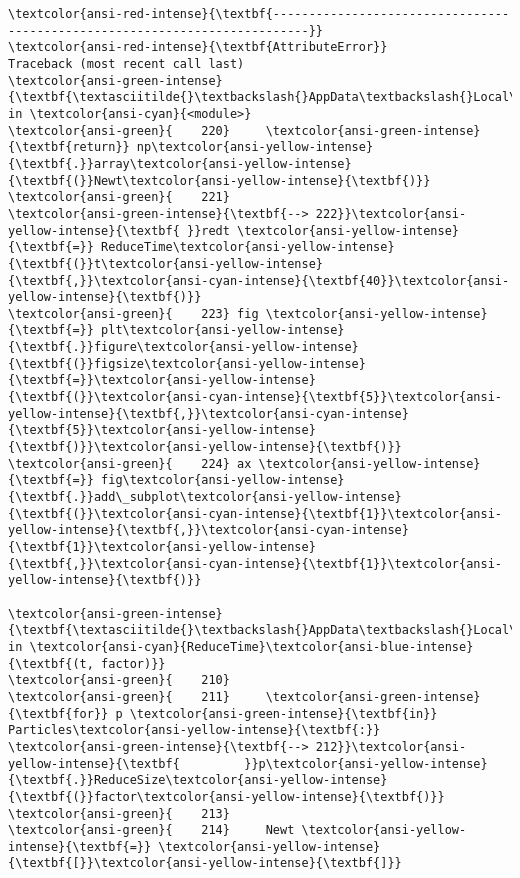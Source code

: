 \documentclass[11pt]{article}
\begin{document}
    \begin{Verbatim}[commandchars=\\\{\}, frame=single, framerule=2mm, rulecolor=\color{outerrorbackground}]
\textcolor{ansi-red-intense}{\textbf{---------------------------------------------------------------------------}}
\textcolor{ansi-red-intense}{\textbf{AttributeError}}                            Traceback (most recent call last)
\textcolor{ansi-green-intense}{\textbf{\textasciitilde{}\textbackslash{}AppData\textbackslash{}Local\textbackslash{}Temp/ipykernel\_12240/2143302627.py}} in \textcolor{ansi-cyan}{<module>}
\textcolor{ansi-green}{    220}     \textcolor{ansi-green-intense}{\textbf{return}} np\textcolor{ansi-yellow-intense}{\textbf{.}}array\textcolor{ansi-yellow-intense}{\textbf{(}}Newt\textcolor{ansi-yellow-intense}{\textbf{)}}
\textcolor{ansi-green}{    221} 
\textcolor{ansi-green-intense}{\textbf{--> 222}}\textcolor{ansi-yellow-intense}{\textbf{ }}redt \textcolor{ansi-yellow-intense}{\textbf{=}} ReduceTime\textcolor{ansi-yellow-intense}{\textbf{(}}t\textcolor{ansi-yellow-intense}{\textbf{,}}\textcolor{ansi-cyan-intense}{\textbf{40}}\textcolor{ansi-yellow-intense}{\textbf{)}}
\textcolor{ansi-green}{    223} fig \textcolor{ansi-yellow-intense}{\textbf{=}} plt\textcolor{ansi-yellow-intense}{\textbf{.}}figure\textcolor{ansi-yellow-intense}{\textbf{(}}figsize\textcolor{ansi-yellow-intense}{\textbf{=}}\textcolor{ansi-yellow-intense}{\textbf{(}}\textcolor{ansi-cyan-intense}{\textbf{5}}\textcolor{ansi-yellow-intense}{\textbf{,}}\textcolor{ansi-cyan-intense}{\textbf{5}}\textcolor{ansi-yellow-intense}{\textbf{)}}\textcolor{ansi-yellow-intense}{\textbf{)}}
\textcolor{ansi-green}{    224} ax \textcolor{ansi-yellow-intense}{\textbf{=}} fig\textcolor{ansi-yellow-intense}{\textbf{.}}add\_subplot\textcolor{ansi-yellow-intense}{\textbf{(}}\textcolor{ansi-cyan-intense}{\textbf{1}}\textcolor{ansi-yellow-intense}{\textbf{,}}\textcolor{ansi-cyan-intense}{\textbf{1}}\textcolor{ansi-yellow-intense}{\textbf{,}}\textcolor{ansi-cyan-intense}{\textbf{1}}\textcolor{ansi-yellow-intense}{\textbf{)}}

\textcolor{ansi-green-intense}{\textbf{\textasciitilde{}\textbackslash{}AppData\textbackslash{}Local\textbackslash{}Temp/ipykernel\_12240/2143302627.py}} in \textcolor{ansi-cyan}{ReduceTime}\textcolor{ansi-blue-intense}{\textbf{(t, factor)}}
\textcolor{ansi-green}{    210} 
\textcolor{ansi-green}{    211}     \textcolor{ansi-green-intense}{\textbf{for}} p \textcolor{ansi-green-intense}{\textbf{in}} Particles\textcolor{ansi-yellow-intense}{\textbf{:}}
\textcolor{ansi-green-intense}{\textbf{--> 212}}\textcolor{ansi-yellow-intense}{\textbf{         }}p\textcolor{ansi-yellow-intense}{\textbf{.}}ReduceSize\textcolor{ansi-yellow-intense}{\textbf{(}}factor\textcolor{ansi-yellow-intense}{\textbf{)}}
\textcolor{ansi-green}{    213} 
\textcolor{ansi-green}{    214}     Newt \textcolor{ansi-yellow-intense}{\textbf{=}} \textcolor{ansi-yellow-intense}{\textbf{[}}\textcolor{ansi-yellow-intense}{\textbf{]}}


\end{Verbatim}
\end{document}
